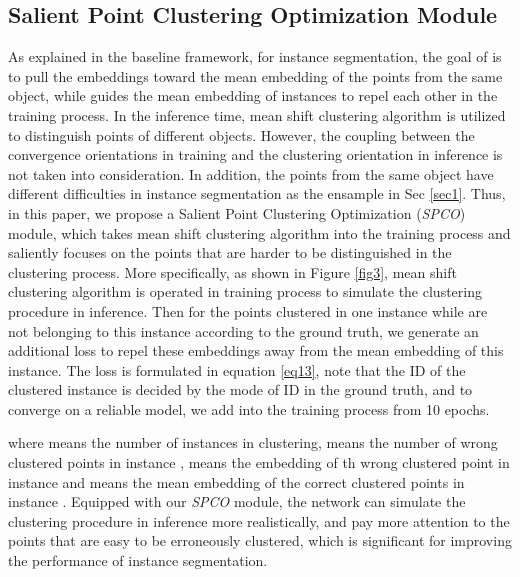 \documentclass{cta-author}
\begin{document}
\subsection{Salient Point Clustering Optimization Module}
\label{subsec:spco}
As explained in the baseline framework, for instance segmentation, the goal of  is to pull the embeddings toward the mean embedding of the points from the same object, while  guides the mean embedding of instances to repel each other in the training process. In the inference time, mean shift clustering algorithm is utilized to distinguish points of different objects. However, the coupling between the convergence orientations in training and the clustering orientation in inference is not taken into consideration. In addition, the points from the same object have different difficulties in instance segmentation as the ensample in Sec \ref{sec1}. Thus, in this paper, we propose a Salient Point Clustering Optimization (\textit{SPCO}) module, which takes mean shift clustering algorithm into the training process and saliently focuses on the points that are harder to be distinguished in the clustering process.
More specifically, as shown in Figure \ref{fig3}, mean shift clustering algorithm is operated in training process to simulate the clustering procedure in inference. Then for the points clustered in one instance while are not belonging to this instance according to the ground truth, we generate an additional loss  to repel these embeddings away from the mean embedding of this instance. The loss  is formulated in equation \eqref{eq13}, note that the ID of the clustered instance is decided by the mode of ID in the ground truth, and to converge on a reliable model, we add  into the training process from 10 epochs.


where  means the number of instances in clustering,  means the number of wrong clustered points in instance ,  means  the embedding of th  wrong clustered point in instance  and  means the mean embedding of the correct clustered points in instance .
Equipped with our \textit{SPCO} module, the network can simulate the clustering procedure in inference more realistically, and pay more attention to the points that are easy to be erroneously clustered, which is significant for improving the performance of instance segmentation.
\end{document}
